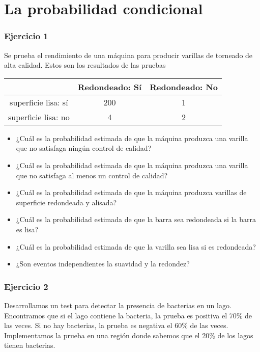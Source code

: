 \documentclass[
]{book}
\begin{document}
\hypertarget{la-probabilidad-condicional-2}{%
\section{La probabilidad condicional}\label{la-probabilidad-condicional-2}}

\hypertarget{ejercicio-1-2}{%
\subsubsection{Ejercicio 1}\label{ejercicio-1-2}}

Se prueba el rendimiento de una máquina para producir varillas de torneado de alta calidad. Estos son los resultados de las pruebas

\begin{longtable}[]{@{}ccc@{}}
\toprule
& Redondeado: Sí & Redondeado: No \\
\midrule
\endhead
superficie lisa: sí & 200 & 1 \\
superficie lisa: no & 4 & 2 \\
\bottomrule
\end{longtable}

\begin{itemize}
\item
  ¿Cuál es la probabilidad estimada de que la máquina produzca una varilla que no satisfaga ningún control de calidad?
\item
  ¿Cuál es la probabilidad estimada de que la máquina produzca una varilla que no satisfaga al menos un control de calidad?
\item
  ¿Cuál es la probabilidad estimada de que la máquina produzca varillas de superficie redondeada y alisada?
\item
  ¿Cuál es la probabilidad estimada de que la barra sea redondeada si la barra es lisa?
\item
  ¿Cuál es la probabilidad estimada de que la varilla sea lisa si es redondeada?
\item
  ¿Son eventos independientes la suavidad y la redondez?
\end{itemize}

\hypertarget{ejercicio-2-2}{%
\subsubsection{Ejercicio 2}\label{ejercicio-2-2}}

Desarrollamos un test para detectar la presencia de bacterias en un lago. Encontramos que si el lago contiene la bacteria, la prueba es positiva el 70\% de las veces. Si no hay bacterias, la prueba es negativa el 60\% de las veces. Implementamos la prueba en una región donde sabemos que el 20\% de los lagos tienen bacterias.
\end{document}
